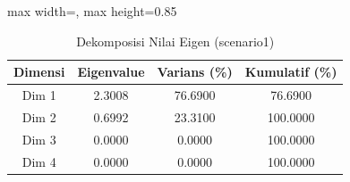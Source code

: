 \begin{table}[H]
\centering
\caption{Dekomposisi Nilai Eigen (scenario1)} \label{tab:sample1eigen}
\begin{adjustbox}{max width=\textwidth, max height=0.85\textheight}
\begin{tabular}{|c|c|c|c|}
\hline
\textbf{Dimensi} & \textbf{Eigenvalue} & \textbf{Varians (\%)} & \textbf{Kumulatif (\%)} \\
\hline
Dim 1 & 2.3008 & 76.6900 & 76.6900 \\
Dim 2 & 0.6992 & 23.3100 & 100.0000 \\
Dim 3 & 0.0000 & 0.0000 & 100.0000 \\
Dim 4 & 0.0000 & 0.0000 & 100.0000 \\
\hline
\end{tabular}
\end{adjustbox}
\end{table}